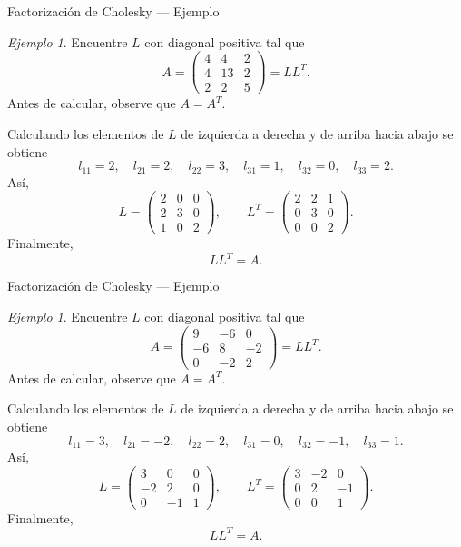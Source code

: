 \documentclass[aspectratio=169,11pt]{beamer}
\theoremstyle{remark}
\newtheorem{Ejem}[definicion]{Ejemplo}
\begin{document}
\begin{frame}[shrink=5]{Factorización de Cholesky — Ejemplo}
\footnotesize
\begin{Ejem}

Encuentre $L$ con diagonal positiva tal que
\[
A=\begin{pmatrix}4 & 4 & 2\\4 & 13 & 2\\2 & 2 & 5\end{pmatrix}=LL^T.
\]
Antes de calcular, observe que $A=A^T$.

Calculando los elementos de $L$ de izquierda a derecha y de arriba hacia abajo se obtiene
\[
l_{11}=2,\quad l_{21}=2,\quad l_{22}=3,\quad l_{31}=1,\quad l_{32}=0,\quad l_{33}=2.
\]
Así,
\[
L=\begin{pmatrix}2 & 0 & 0\\2 & 3 & 0\\1 & 0 & 2\end{pmatrix},\qquad L^T=\begin{pmatrix}2 & 2 & 1\\0 & 3 & 0\\0 & 0 & 2\end{pmatrix}.
\]
Finalmente,
\[
\boxed{LL^T=A}.
\]

\end{Ejem}
\end{frame}

\begin{frame}[shrink=5]{Factorización de Cholesky — Ejemplo}
\footnotesize
\begin{Ejem}

Encuentre $L$ con diagonal positiva tal que
\[
A=\begin{pmatrix}9 & -6 & 0\\-6 & 8 & -2\\0 & -2 & 2\end{pmatrix}=LL^T.
\]
Antes de calcular, observe que $A=A^T$.

Calculando los elementos de $L$ de izquierda a derecha y de arriba hacia abajo se obtiene
\[
l_{11}=3,\quad l_{21}=-2,\quad l_{22}=2,\quad l_{31}=0,\quad l_{32}=-1,\quad l_{33}=1.
\]
Así,
\[
L=\begin{pmatrix}3 & 0 & 0\\-2 & 2 & 0\\0 & -1 & 1\end{pmatrix},\qquad L^T=\begin{pmatrix}3 & -2 & 0\\0 & 2 & -1\\0 & 0 & 1\end{pmatrix}.
\]
Finalmente,
\[
\boxed{LL^T=A}.
\]
\end{Ejem}
\end{frame}
\end{document}
